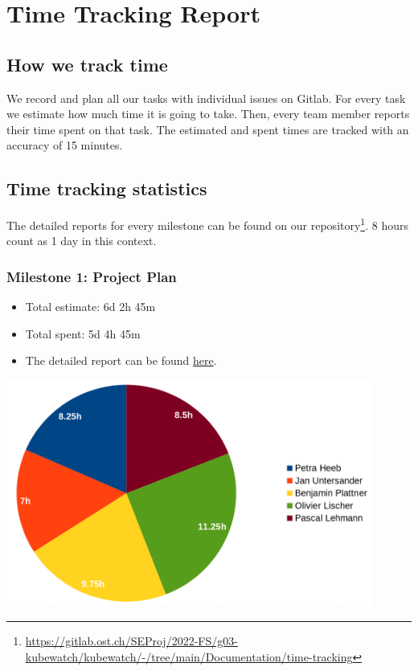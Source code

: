 \chapter{Time Tracking Report}

\section{How we track time}
We record and plan all our tasks with individual issues on Gitlab.
For every task we estimate how much time it is going to take. Then, every team member reports their time spent on that task.
The estimated and spent times are tracked with an accuracy of 15 minutes.

\section{Time tracking statistics}
The detailed reports for every milestone can be found on our repository\footnote{\url{https://gitlab.ost.ch/SEProj/2022-FS/g03-kubewatch/kubewatch/-/tree/main/Documentation/time-tracking}}.
8 hours count as 1 day in this context.

\subsection{Milestone 1: Project Plan}
\begin{itemize}
    \item Total estimate: 6d 2h 45m
    \item Total spent: 5d 4h 45m
    \item The detailed report can be found \href{https://gitlab.ost.ch/SEProj/2022-FS/g03-kubewatch/kubewatch/-/blob/main/Documentation/time-tracking/M1\%20Project\%20Plan\%20Time\%20Tracking\%20Report.md}{here}.
\end{itemize}
\includegraphics[width=12cm]{resources/m1_time_tracking_chart.png}

